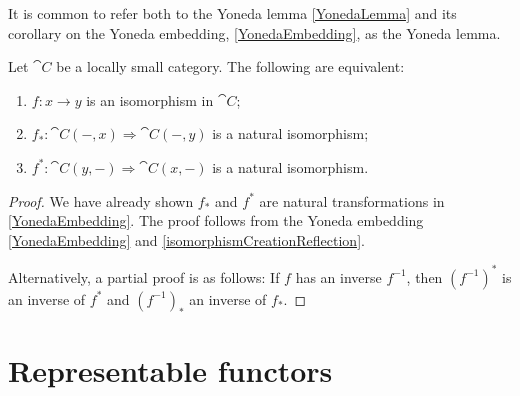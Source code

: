It is common to refer both to the Yoneda lemma \ref{YonedaLemma} and its corollary on the Yoneda embedding, \ref{YonedaEmbedding}, as the Yoneda lemma.

\begin{proposition} \label{representablyIsomorphic}
Let $\cat{C}$ be a locally small category. The following are equivalent:
\begin{enumerate}
\item $f:x\to y$ is an isomorphism in $\cat{C}$;
\item $f_*: \cat{C}(-,x) \Rightarrow \cat{C}(-,y)$ is a natural isomorphism;
\item $f^*: \cat{C}(y,-) \Rightarrow \cat{C}(x,-)$ is a natural isomorphism.
\end{enumerate}
\end{proposition}
\begin{proof}
We have already shown $f_*$ and $f^*$ are natural transformations in \ref{YonedaEmbedding}.
The proof follows from the Yoneda embedding \ref{YonedaEmbedding} and \ref{isomorphismCreationReflection}.

Alternatively, a partial proof is as follows: If $f$ has an inverse $f^{-1}$, then $(f^{-1})^*$ is an inverse of $f^*$ and $(f^{-1})_*$ an inverse of $f_*$.
\end{proof}

\section{Representable functors}
